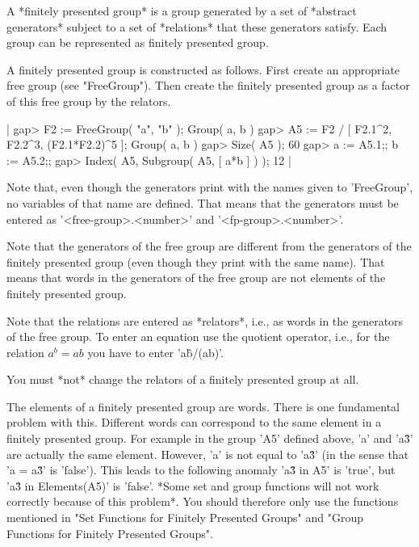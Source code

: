 A *finitely presented  group* is a group generated by a set  of *abstract
generators*  subject  to  a  set  of  *relations* that  these  generators
satisfy.  Each group can be represented as finitely presented group.

A finitely  presented group is  constructed as follows.   First create an
appropriate   free group (see  "FreeGroup").    Then create the  finitely
presented group as a factor of this free group by the relators.

|    gap> F2 := FreeGroup( "a", "b" );
    Group( a, b )
    gap> A5 := F2 / [ F2.1^2, F2.2^3, (F2.1*F2.2)^5 ];
    Group( a, b )
    gap> Size( A5 );
    60
    gap> a := A5.1;;  b := A5.2;;
    gap> Index( A5, Subgroup( A5, [ a*b ] ) );
    12 |

Note  that,  even though  the  generators print  with  the names given to
'FreeGroup', no variables of that name are  defined.  That means that the
generators  must   be      entered    as  '<free-group>.<number>'     and
'<fp-group>.<number>'.

Note  that the  generators  of  the free   group  are different from  the
generators of the finitely presented  group (even though they print  with
the same name).    That means that  words  in the generators  of the free
group are not elements of the finitely presented group.

Note that the relations are entered as *relators*, i.e.,  as words in the
generators of  the free group.   To  enter an  equation  use the quotient
operator, i.e.,  for   the  relation  $a^b   = ab$  you have   to   enter
'a\^b/(a\*b)'.

You must *not* change  the relators of a finitely presented group at all.

The  elements of  a  finitely presented  group are  words.  There  is one
fundamental  problem  with  this.  Different words  can correspond to the
same element in  a finitely presented  group.   For example in  the group
'A5'  defined  above,  'a'  and 'a\^3'  are  actually  the  same element.
However,  'a' is not equal to  'a\^3' (in the  sense  that 'a  = a\^3' is
'false').   This  leads  to the  following  anomaly{\:}  'a\^3 in  A5' is
'true',  but 'a\^3 in Elements(A5)' is  'false'.   *Some  set  and  group
functions  will not work correctly because of  this problem*.  You should
therefore only use the functions mentioned in "Set Functions for Finitely
Presented Groups" and "Group Functions for Finitely Presented Groups".

